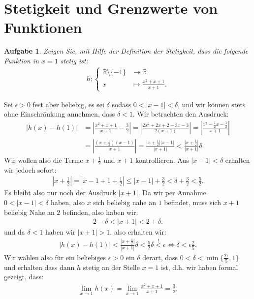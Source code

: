 \documentclass[a4paper, 20]{exam}
\newtheorem{ex}{Aufgabe}
\begin{document}
\newpage


\section{Stetigkeit und Grenzwerte von Funktionen}


\begin{ex}
Zeigen Sie, mit Hilfe der Definition der Stetigkeit, dass die folgende Funktion in $x=1$ stetig ist:
\begin{align*}
h: \begin{cases} \mathbb{R} \setminus \lbrace -1 \rbrace & \longrightarrow \mathbb{R} \\
x & \longmapsto \frac{x^2+x+1}{x+1}. \end{cases}
\end{align*}
\end{ex}


\begin{solution}
Sei $ \epsilon >0$ fest aber beliebig, es sei $\delta$ sodass $0< |x-1| < \delta$, und wir können stets ohne Einschränkung annehmen, dass $\delta < 1$. Wir betrachten den Ausdruck:
\begin{align*}
|h(x)-h(1)| &= \left| \frac{x^2 + x +1}{x+1} - \frac{3}{2} \right| = \left| \frac{2x^2+2x+2-3x-3}{2(x+1)} \right| = \left| \frac{x^2- \frac{1}{2}x- \frac{1}{2}}{x+1} \right| \\
& = \left| \frac{ \left( x + \frac{1}{2}\right) (x-1)}{x+1} \right| = \frac{ \left| x + \frac{1}{2}\right| |x-1|}{|x+1|} < \frac{\left|x + \frac{1}{2} \right|}{|x+1|} \delta.
\end{align*}
Wir wollen also die Terme $x+ \frac{1}{2}$ und $x+1$ kontrollieren. Aus $|x-1| < \delta$ erhalten wir jedoch sofort:
\begin{align*}
\left| x + \frac{1}{2} \right| = \left| x -1 +1 + \frac{1}{2} \right| \leq |x-1| + \frac{3}{2} < \delta + \frac{3}{2}< \frac{5}{2}.
\end{align*}
Es bleibt also nur noch der Ausdruck $|x+1|$. Da wir per Annahme $0 < |x-1| < \delta$ haben,  also $x$ sich beliebig nahe an $1$ befindet, muss sich $x+1$ beliebig Nahe an $2$ befinden, also haben wir:
\begin{align*}
2 -\delta < |x+1| < 2 + \delta.
\end{align*}
und da $\delta <1$ haben wir $|x+1| >1$, also erhalten wir:
\begin{align*}
|h(x)-h(1)| < \frac{\left| x + \frac{1}{2} \right|}{|x+1|} \delta < \frac{5}{2} \delta \overset{!}< \epsilon \iff \delta < \epsilon \frac{2}{5}.
\end{align*} 
Wir wählen also für ein beliebiges $\epsilon >0$ ein $\delta$ derart, dass $0 < \delta < \min \lbrace \frac{2\epsilon}{5},1 \rbrace$ und erhalten dass dann $h$ stetig an der Stelle $x=1$ ist, d.h. wir haben formal gezeigt, dass:
\begin{align*}
\lim_{x \rightarrow 1} h(x) = \lim_{x \rightarrow 1} \frac{x^2 + x+1}{x+1} = \frac{3}{2}.
\end{align*}
\end{solution}
\end{document}
